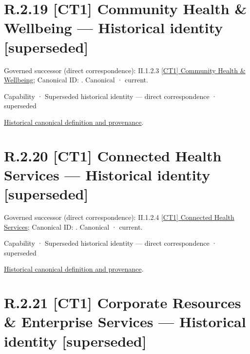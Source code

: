 \section*{R.2.19 [CT1] Community Health \& Wellbeing — Historical identity [superseded]}
\label{navigation:R.2.19}

{\small Governed successor (direct correspondence): II.1.2.3 \hyperref[element:b326b4aaf02a41a986ed22d184cbc152]{[CT1] Community Health \& Wellbeing}; Canonical ID: \texttt{}. Canonical · current.}\par
\label{element:175174c5cce549d2b154a4f6704721dc}
{\small Capability · Superseded historical identity — direct correspondence · superseded}\par
\href{../../../../../../../continuum/strategy/capability/175174c5cce549d2b154a4f6704721dc.md}{Historical canonical definition and provenance}.\par
\section*{R.2.20 [CT1] Connected Health Services — Historical identity [superseded]}
\label{navigation:R.2.20}

{\small Governed successor (direct correspondence): II.1.2.4 \hyperref[element:3ef397463e584737b367e93f0bf1d85d]{[CT1] Connected Health Services}; Canonical ID: \texttt{}. Canonical · current.}\par
\label{element:48f01ef8b0e6431c85cf4f40cf8f94c3}
{\small Capability · Superseded historical identity — direct correspondence · superseded}\par
\href{../../../../../../../continuum/strategy/capability/48f01ef8b0e6431c85cf4f40cf8f94c3.md}{Historical canonical definition and provenance}.\par
\section*{R.2.21 [CT1] Corporate Resources \& Enterprise Services — Historical identity [superseded]}
\label{navigation:R.2.21}

